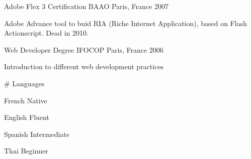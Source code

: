 

\begin{cventries}

  \cventry
    {Adobe Flex 3 Certification} %
    {BAAO} %
    {Paris, France} %
    {2007} %
    {
      \begin{cvitems} %
        \item {Adobe Advance tool to buid RIA (Riche Internet Application), based on Flash Actionscript. Dead in 2010.}
      \end{cvitems}
    }
    { } %
  \cventry
    {Web Developer Degree} %
    {IFOCOP} %
    {Paris, France} %
    {2006} %
    {
      \begin{cvitems} %
        \item {Introduction to different web development practices}
      \end{cvitems}
    }
    { } %

  \cventry
    {} %
    {\# Languages} %
    { } %
    { } %
    {
      \begin{cvitems} %
        \item {French Native}
        \item {English Fluent}
        \item {Spanish Intermediate}
        \item {Thai Beginner}
      \end{cvitems}
    }
    { } %

\end{cventries}

